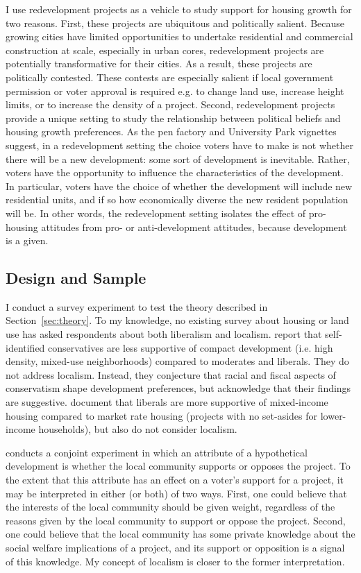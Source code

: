 \documentclass[article,11pt]{memoir}
\begin{document}
I use redevelopment projects as a vehicle to study support for housing growth for two reasons.  First, these projects are ubiquitous and politically salient.  Because growing cities have limited opportunities to undertake residential and commercial construction at scale, especially in urban cores, redevelopment projects are potentially transformative for their cities. As a result, these projects are politically contested.  These contests are especially salient if local government permission or voter approval is required e.g. to change land use, increase height limits, or to increase the density of a project.  Second, redevelopment projects provide a unique setting to study the relationship between political beliefs and housing growth preferences.  As the pen factory and University Park vignettes suggest, in a redevelopment setting the choice voters have to make is not whether there will be a new development: some sort of development is inevitable.  Rather, voters have the opportunity to influence the characteristics of the development.  In particular, voters have the choice of whether the development will include new residential units, and if so how  economically diverse the new resident population will be.  In other words, the redevelopment setting isolates the effect of pro-housing attitudes from pro- or anti-development attitudes, because development is a given.

\subsection{Design and Sample}

I conduct a survey experiment to test the theory described in Section~\ref{sec:theory}.  To my knowledge, no existing survey about housing or land use has asked respondents about both liberalism and localism. \cite{lewis_complexity_2010} report that self-identified conservatives are less supportive of compact development (i.e. high density, mixed-use neighborhoods) compared to moderates and liberals. They do not address localism.  Instead, they conjecture that racial and fiscal aspects of conservatism shape development preferences, but acknowledge that their findings are suggestive. \cite{marble_where_2018} document that liberals are more supportive of mixed-income housing compared to market rate housing (projects with no set-asides for lower-income households), but also do not consider localism. 

\cite{hankinson_when_2018} conducts a conjoint experiment in which an attribute of a hypothetical development is whether the local community supports or opposes the project. To the extent that this attribute has an effect on a voter's support for a project, it may be interpreted in either (or both) of two ways. First, one could believe that the interests of the local community should be given weight, regardless of the reasons given by the local community to support or oppose the project. Second, one could believe that the local community has some private knowledge about the social welfare implications of a project, and its support or opposition is a signal of this knowledge.  My concept of localism is closer to the former interpretation.
\end{document}

